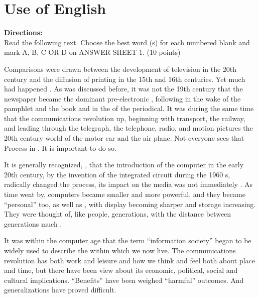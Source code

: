 

\section{Use of English}

\noindent
\textbf{Directions:}\\
Read the following text. Choose the best word (s) for each
	numbered blank and mark A, B, C OR D on ANSWER SHEET 1. (10 points)

\TiGanSpace

Comparisons were drawn between the development of television in the 20th
century and the diffusion of printing in the 15th and 16th centuries.
Yet much had happened \cloze. As was discussed before, it was
not \cloze the 19th century that the newspaper became the
dominant pre-electronic \cloze , following in the wake of
the pamphlet and the book and in the \cloze of the periodical. It
was during the same time that the communications revolution
\cloze up, beginning with transport, the railway, and leading
\cloze through the telegraph, the telephone, radio, and motion
pictures \cloze the 20th century world of the
motor car and the air plane. Not everyone sees that Process in
\cloze. It is important to do so.

It is generally recognized, \cloze , that the introduction of the
computer in the early 20th century, \cloze by the invention of
the integrated circuit during the 1960 s, radically changed the process,
\cloze its impact on the media was not immediately
\cloze. As time went by, computers became smaller and more
powerful, and they became ``personal'' too, as well as \cloze ,
with display becoming sharper and storage \cloze increasing.
They were thought of, like people, \cloze generations, with the
distance between generations much \cloze.

It was within the computer age that the term ``information society''
began to be widely used to describe the \cloze within which we
now live. The communications revolution has \cloze both work and
leisure and how we think and feel both about place and time, but there
have been \cloze view about its economic, political, social and
cultural implications. ``Benefits'' have been weighed \cloze
``harmful'' outcomes. And generalizations have proved difficult.


